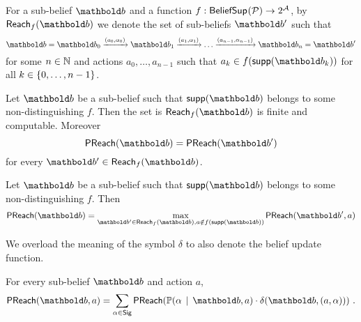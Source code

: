 %
%
\begin{notation}
For a sub-belief $\bel{b}$ and a function $f : \mathsf{BeliefSup}_{}(\mathcal{P}) \to 2^{\mathcal{A}}$,
by $\reach{f}(\bel{b})$ we denote the set of sub-beliefs $\bel{b}'$ such that
\[
\bel{b} =
\bel{b}_0 \xrightarrow{(a_0,\alpha_0)}
\bel{b}_1 \xrightarrow{(a_1,\alpha_1)}
\dots
\xrightarrow{(a_{n-1},\alpha_{n-1})}
\bel{b}_n = \bel{b}'
\]
for some $n\in\mathbb{N}$ and actions $a_0,\dots,a_{n-1}$ such that $a_k\in f(\supp{\bel{b}_k})$ for all $k\in\left\lbrace 0,\dots,n-1\right\rbrace$.
\end{notation}
%
\begin{lemma}
Let $\bel{b}$ be a sub-belief such that $\supp{\bel{b}}$ belongs to some non-distinguishing \adscc{} $f$.
Then the set is $\reach{f}(\bel{b})$ is finite and computable.
Moreover
\[
\preach(\bel{b}) = \preach(\bel{b}')
\]
for every $\bel{b}' \in \reach{f}(\bel{b})$.
\end{lemma}
%
\begin{lemma}
Let $\bel{b}$ be a sub-belief such that $\supp{\bel{b}}$ belongs to some non-distinguishing \adscc{} $f$.
Then
\[
\preach(\bel{b}) =
\max_{\bel{b}'\in\reach{f}(\bel{b}),
a\notin f(\supp{\bel{b}})}
\preach(\bel{b}',a)
\]
\end{lemma}
%
\begin{notation}
We overload the meaning of the symbol $\delta$ to also denote the belief update function.
\end{notation}
%
\begin{lemma}
For every sub-belief $\bel{b}$ and action $a$,
\[
\preach(\bel{b},a) =
\sum_{\alpha\in\sig}
\preach(\pgiven{\alpha}{\bel{b},a}\cdot \beltr{\bel{b}}{(a,\alpha)}) \ .
\]
\end{lemma}
%
